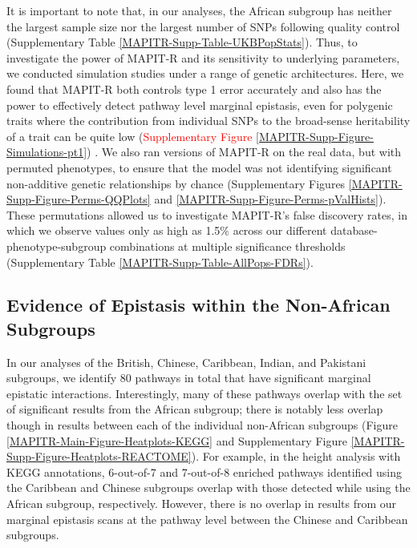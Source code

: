 \documentclass[10pt]{article}
\begin{document}
It is important to note that, in our analyses, the African subgroup has neither the largest sample size nor the largest number of SNPs following quality control (Supplementary Table \ref{MAPITR-Supp-Table-UKBPopStats}). Thus, to investigate the power of MAPIT-R and its sensitivity to underlying parameters, we conducted simulation studies under a range of genetic architectures. Here, we found that MAPIT-R both controls type 1 error accurately and also has the power to effectively detect pathway level marginal epistasis, even for polygenic traits where the contribution from individual SNPs to the broad-sense heritability of a trait can be quite low (\textcolor{red}{Supplementary Figure \ref{MAPITR-Supp-Figure-Simulations-pt1}}) \cite{Crawford2017a}. We also ran versions of MAPIT-R on the real data, but with permuted phenotypes, to ensure that the model was not identifying significant non-additive genetic relationships by chance (Supplementary Figures \ref{MAPITR-Supp-Figure-Perms-QQPlots} and \ref{MAPITR-Supp-Figure-Perms-pValHists}). These permutations allowed us to investigate MAPIT-R's false discovery rates, in which we observe values only as high as 1.5\% across our different database-phenotype-subgroup combinations at multiple significance thresholds (Supplementary Table \ref{MAPITR-Supp-Table-AllPops-FDRs}).

\subsection*{Evidence of Epistasis within the Non-African Subgroups}

In our analyses of the British, Chinese, Caribbean, Indian, and Pakistani subgroups, we identify 80 pathways in total that have significant marginal epistatic interactions. Interestingly, many of these pathways overlap with the set of significant results from the African subgroup; there is notably less overlap though in results between each of the individual non-African subgroups (Figure \ref{MAPITR-Main-Figure-Heatplots-KEGG} and Supplementary Figure \ref{MAPITR-Supp-Figure-Heatplots-REACTOME}). For example, in the height analysis with KEGG annotations, 6-out-of-7 and 7-out-of-8 enriched pathways identified using the Caribbean and Chinese subgroups overlap with those detected while using the African subgroup, respectively. However, there is no overlap in results from our marginal epistasis scans at the pathway level between the Chinese and Caribbean subgroups.
\end{document}
